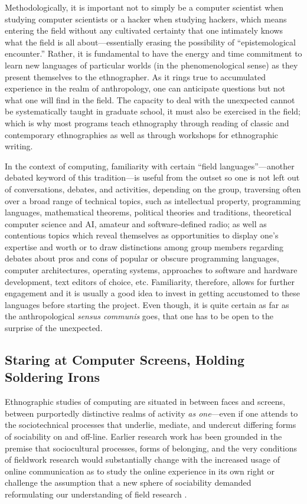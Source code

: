 \documentclass[10pt,letter,oneside]{scrartcl}
\begin{document}
Methodologically, it is important not to simply be a computer
scientist when studying computer scientists or a hacker when studying
hackers, which means entering the field without any cultivated
certainty that one intimately knows what the field is all
about---essentially erasing the possibility of ``epistemological
encounter.''  Rather, it is fundamental to have the energy and time
commitment to learn new languages of particular worlds (in the
phenomenological sense) as they present themselves to the
ethnographer.  As it rings true to accumulated experience in the realm
of anthropology, one can anticipate questions but not what one will
find in the field. The capacity to deal with the unexpected cannot be
systematically taught in graduate school, it must also be exercised in
the field; which is why most programs teach ethnography through
reading of classic and contemporary ethnographies as well as through
workshops for ethnographic writing.

In the context of computing, familiarity with certain ``field
languages''---another debated keyword of this tradition---is useful from the
outset so one is not left out of conversations, debates, and
activities, depending on the group, traversing often over a broad range 
of technical topics, such as intellectual property, programming languages, 
mathematical theorems, political theories and traditions, theoretical 
computer science and AI, amateur and software-defined radio; as well as
contentious topics which reveal themselves as opportunities to display
one's expertise and worth or to draw distinctions among group members
regarding debates about pros and cons of popular or obscure
programming languages, computer architectures, operating systems,
approaches to software and hardware development, text editors of
choice, etc. Familiarity, therefore, allows for further engagement and
it is usually a good idea to invest in getting accustomed to these
languages before starting the project. Even though, it is quite
certain as far as the anthropological \emph{sensus communis} goes,
that one has to be open to the surprise of the unexpected.



\subsection*{Staring at Computer Screens, Holding Soldering Irons}

Ethnographic studies of computing are situated in between faces and
screens, between purportedly distinctive realms of activity \emph{as
  one}---even if one attends to the sociotechnical processes that
underlie, mediate, and undercut differing forms of sociability on and
off-line. Earlier research work has been grounded in the premise that
sociocultural processes, forms of belonging, and the very conditions
of fieldwork research would substantially change with the increased
usage of online communication as to study the online experience in its
own right \cite{Turkle1984,Hine2000,BOELLSTORFF2008} or challenge the
assumption that a new sphere of sociability demanded reformulating our
understanding of field research \cite{Miller2001,Malaby2009}.
\end{document}
